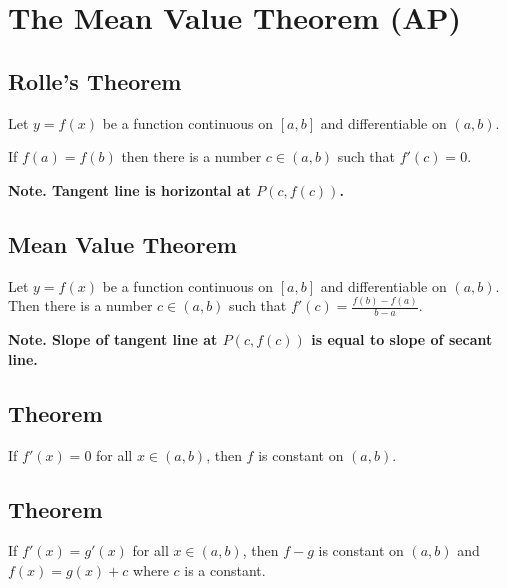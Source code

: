 \section{The Mean Value Theorem (AP)}
\subsection{Rolle's Theorem}
	Let $y=f(x)$ be a function continuous on $[a,b]$ and differentiable on $(a,b)$.

	If $f(a) = f(b)$ then there is a number $c \in (a,b)$ such that $f'(c) = 0$.

	\textbf{Note. Tangent line is horizontal at $P(c, f(c))$.}
\subsection{Mean Value Theorem}
	Let $y=f(x)$ be a function continuous on $[a,b]$ and differentiable on $(a,b)$.
	Then there is a number $c \in (a,b)$ such that $f'(c) = \frac{f(b) - f(a)}{b-a}$.

	\textbf{Note. Slope of tangent line at $P(c,f(c))$ is equal to slope of secant line.}
\subsection{Theorem}
	If $f'(x) = 0$ for all $x \in (a,b)$, then $f$ is constant on $(a,b)$.
\subsection{Theorem}
	If $f'(x) = g'(x)$ for all $x \in (a,b)$, then $f-g$ is constant on $(a,b)$ and $f(x) = g(x) + c$ where $c$ is a constant.
